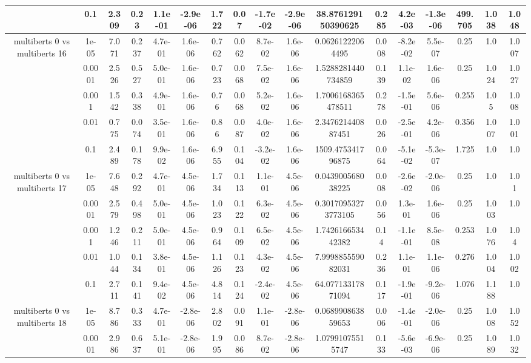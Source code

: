 \begin{tabular}{|c|c|c|c|c|c|c|c|c|c|c|c|c|c|c|c|c|}
 & 0.1 & 2.309 & 0.23 & 1.1e-01 & -2.9e-06 & 1.722 & 0.07 & -1.7e-02 & -2.9e-06 & 38.876129150390625 & 0.285 & 4.2e-03 & -1.3e-06 & 499.705 & 1.038 & 1.048 \\
\hline
\multirow{5}{*}{multiberts 0 vs multiberts 16} & 1e-05 & 7.071 & 0.237 & 4.7e-01 & 1.6e-06 & 0.762 & 0.062 & 8.7e-02 & 1.6e-06 & 0.06261222064495 & 0.008 & -8.2e-02 & 5.5e-07 & 0.25 & 1.0 & 1.007 \\
 & 0.0001 & 2.526 & 0.527 & 5.0e-01 & 1.6e-06 & 0.723 & 0.068 & 7.5e-02 & 1.6e-06 & 1.5288281440734859 & 0.139 & 1.1e-02 & 1.6e-06 & 0.25 & 1.024 & 1.027 \\
 & 0.001 & 1.542 & 0.338 & 4.9e-01 & 1.6e-06 & 0.76 & 0.068 & 5.2e-02 & 1.6e-06 & 1.7006168365478511 & 0.278 & -1.5e-01 & 5.6e-06 & 0.255 & 1.05 & 1.008 \\
 & 0.01 & 0.775 & 0.074 & 3.5e-01 & 1.6e-06 & 0.86 & 0.087 & 4.0e-02 & 1.6e-06 & 2.347621440887451 & 0.026 & -2.5e-01 & 4.2e-06 & 0.356 & 1.007 & 1.001 \\
 & 0.1 & 2.489 & 0.178 & 9.9e-02 & 1.6e-06 & 6.955 & 0.104 & -3.2e-02 & 1.6e-06 & 1509.475341796875 & 0.064 & -5.1e-02 & -5.3e-07 & 1.725 & 1.0 & 1.0 \\
\hline
\multirow{5}{*}{multiberts 0 vs multiberts 17} & 1e-05 & 7.648 & 0.292 & 4.7e-01 & 4.5e-06 & 1.734 & 0.113 & 1.1e-01 & 4.5e-06 & 0.043900568038225 & 0.008 & -2.6e-02 & -2.0e-06 & 0.25 & 1.0 & 1.01 \\
 & 0.0001 & 2.579 & 0.498 & 5.0e-01 & 4.5e-06 & 1.023 & 0.122 & 6.3e-02 & 4.5e-06 & 0.30170953273773105 & 0.056 & 1.3e-01 & 1.6e-06 & 0.25 & 1.003 & 1.0 \\
 & 0.001 & 1.246 & 0.211 & 5.0e-01 & 4.5e-06 & 0.964 & 0.109 & 6.5e-02 & 4.5e-06 & 1.742616653442382 & 0.14 & -1.1e-01 & 8.5e-08 & 0.253 & 1.076 & 1.04 \\
 & 0.01 & 1.044 & 0.134 & 3.8e-01 & 4.5e-06 & 1.126 & 0.123 & 4.3e-02 & 4.5e-06 & 7.999885559082031 & 0.236 & 1.1e-01 & 1.1e-06 & 0.276 & 1.004 & 1.002 \\
 & 0.1 & 2.711 & 0.141 & 9.4e-02 & 4.5e-06 & 4.814 & 0.124 & -2.4e-02 & 4.5e-06 & 64.07713317871094 & 0.117 & -1.9e-01 & -9.2e-06 & 1.076 & 1.188 & 1.0 \\
\hline
\multirow{5}{*}{multiberts 0 vs multiberts 18} & 1e-05 & 8.786 & 0.333 & 4.7e-01 & -2.8e-06 & 2.802 & 0.091 & 1.1e-01 & -2.8e-06 & 0.068990863859653 & 0.006 & -1.4e-01 & -2.0e-06 & 0.25 & 1.008 & 1.052 \\
 & 0.0001 & 2.986 & 0.637 & 5.1e-01 & -2.8e-06 & 1.995 & 0.086 & 8.7e-02 & -2.8e-06 & 1.07991075515747 & 0.133 & -5.6e-03 & -6.9e-06 & 0.25 & 1.089 & 1.032 \\

\end{tabular}

